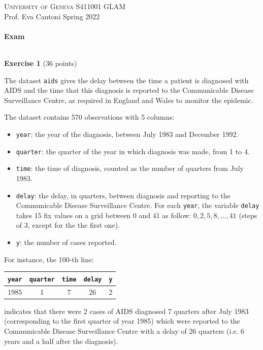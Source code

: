\documentclass[11pt,a4paper%
addpoints, 
]{exam}
\begin{document}
\noindent \textsc{University of Geneva} \hfill S411001 GLAM\\
Prof. Eva Cantoni \hfill Spring 2022\\
\noindent
\makebox[\linewidth]{\rule{\textwidth}{0.4pt}}\\[1.5ex]
\hfill \textbf{Exam} \hfill {}\\
\makebox[\linewidth]{\rule{\textwidth}{0.4pt}}\\

\bigskip

\setlength{\parskip}{1ex plus 0.5ex minus 0.2ex}
\parindent=0cm
\linespread{1.1}


{\Large \textbf{Exercise 1} \hfill (36 points)}

\bigskip 


The dataset \texttt{aids} gives the delay between the time a patient is diagnosed with AIDS and the time that this diagnosis is reported to the Communicable Disease Surveillance Centre, as required in England and Wales to monitor the epidemic.

The dataset contains 570 observations with 5 columns: 
\begin{itemize}
	\item \texttt{year}: the year of the diagnosis, between July 1983 and December 1992. 
	\item \texttt{quarter}: the quarter of the year in which diagnosis was made, from 1 to 4.
	\item \texttt{time}: the time of diagnosis, counted as the number of quarters from July 1983.
	\item \texttt{delay}: the delay, in quarters, between diagnosis and reporting to the Communicable Disease Surveillance Centre. For each \texttt{year}, the variable \texttt{delay} takes 15 fix values on a grid between 0 and 41 as follow: $ 0, 2, 5, 8, \ldots, 41$ (steps of 3, except for the the first one).
	\item \texttt{y}: the number of cases reported.
\end{itemize}
For instance, the 100-th line:
\begin{center}
	\begin{tabular}{ |c|c|c|c|c| } 
		\hline
		\texttt{year} & \texttt{quarter} & \texttt{time} & \texttt{delay} & \texttt{y} \\ 
		\hline
		1985 &    1   & 7	    &         26    & 2 \\
		\hline
	\end{tabular}
\end{center}
indicates that there were 2 cases of AIDS diagnosed 7 quarters after July 1983 (corresponding to the first quarter of year 1985) which were reported to the Communicable Disease Surveillance Centre with a delay of 26 quarters (i.e. 6 years and a half after the diagnosis).
\end{document}

